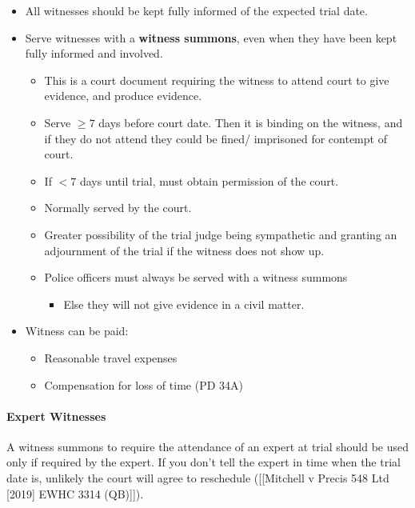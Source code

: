 \documentclass[
]{article}
\providecommand{\tightlist}{%
  \setlength{\itemsep}{0pt}\setlength{\parskip}{0pt}}
\begin{document}
\begin{itemize}
\tightlist
\item
  All witnesses should be kept fully informed of the expected trial
  date.
\item
  Serve witnesses with a \textbf{witness summons}, even when they have
  been kept fully informed and involved.

  \begin{itemize}
  \tightlist
  \item
    This is a court document requiring the witness to attend court to
    give evidence, and produce evidence.
  \item
    Serve \(\geq 7\) days before court date. Then it is binding on the
    witness, and if they do not attend they could be fined/ imprisoned
    for contempt of court.
  \item
    If \(<7\) days until trial, must obtain permission of the court.
  \item
    Normally served by the court.
  \item
    Greater possibility of the trial judge being sympathetic and
    granting an adjournment of the trial if the witness does not show
    up.
  \item
    Police officers must always be served with a witness summons

    \begin{itemize}
    \tightlist
    \item
      Else they will not give evidence in a civil matter.
    \end{itemize}
  \end{itemize}
\item
  Witness can be paid:

  \begin{itemize}
  \tightlist
  \item
    Reasonable travel expenses
  \item
    Compensation for loss of time (PD 34A)
  \end{itemize}
\end{itemize}

\hypertarget{expert-witnesses}{%
\paragraph{Expert Witnesses}\label{expert-witnesses}}

A witness summons to require the attendance of an expert at trial should
be used only if required by the expert. If you don't tell the expert in
time when the trial date is, unlikely the court will agree to reschedule
({[}{[}Mitchell v Precis 548 Ltd {[}2019{]} EWHC 3314 (QB){]}{]}).
\end{document}
